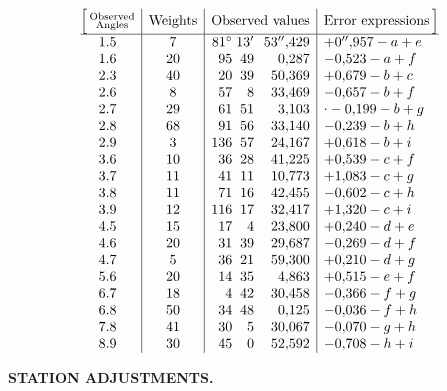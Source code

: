 \[
\begin{array}{@{}c|c|r@{\;}r@{\;}r|l@{}}
 \Bigl[\,\substack{\text{Observed}\\\text{Angles}}&
 \text{Weights}&\multicolumn{3}{c|}{\text{Observed values}}&
 \multicolumn{1}{c@{}}{\text{Error expressions}\,\Bigr]}\\
 \hline
 1.5&7&81^\circ&13'&53''{,}429&+0''{,}957-a+e\\
 1.6&20&95&49&0{,}287&-0{,}523-a+f\\
 2.3&40&20&39&50{,}369&+0{,}679-b+c\\
 2.6&8&57&8&33{,}469&-0{,}657-b+f\\
 2.7&29&61&51&3{,}103&\mathord{\raisebox{.55ex}{.}}-0{,}199-b+g\\
 2.8&68&91&56&33{,}140&-0{,}239-b+h\\
 2.9&3&136&57&24{,}167&+0{,}618-b+i\\
 3.6&10&36&28&41{,}225&+0{,}539-c+f\\
 3.7&11&41&11&10{,}773&+1{,}083-c+g\\
 3.8&11&71&16&42{,}455&-0{,}602-c+h\\
 3.9&12&116&17&32{,}417&+1{,}320-c+i\\
 4.5&15&17&4&23{,}800&+0{,}240-d+e\\
 4.6&20&31&39&29{,}687&-0{,}269-d+f\\
 4.7&5&36&21&59{,}300&+0{,}210-d+g\\
 5.6&20&14&35&4{,}863&+0{,}515-e+f\\
 6.7&18&4&42&30{,}458&-0{,}366-f+g\\
 6.8&50&34&48&0{,}125&-0{,}036-f+h\\
 7.8&41&30&5&30{,}067&-0{,}070-g+h\\
 8.9&30&45&0&52{,}592&-0{,}708-h+i
\end{array}
\]

\par\clearpage
\noindent\null\hfill{\small\textbf{STATION ADJUSTMENTS.}}\hfill{}\par\medskip

